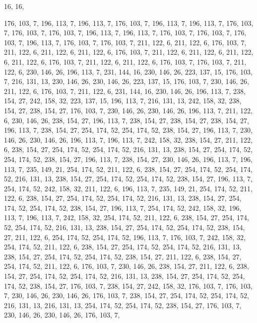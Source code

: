 16, 16,

176, 103, 7, 196, 113, 7, 196, 113, 7, 176, 103, 7, 196, 113, 7, 196,
113, 7, 176, 103, 7, 176, 103, 7, 176, 103, 7, 196, 113, 7, 196, 113,
7, 176, 103, 7, 176, 103, 7, 176, 103, 7, 196, 113, 7, 176, 103, 7,
176, 103, 7, 211, 122, 6, 211, 122, 6, 176, 103, 7, 211, 122, 6, 211,
122, 6, 211, 122, 6, 176, 103, 7, 211, 122, 6, 211, 122, 6, 211, 122,
6, 211, 122, 6, 176, 103, 7, 211, 122, 6, 211, 122, 6, 176, 103, 7,
176, 103, 7, 211, 122, 6, 230, 146, 26, 196, 113, 7, 231, 144, 16, 230,
146, 26, 223, 137, 15, 176, 103, 7, 216, 131, 13, 230, 146, 26, 230, 146,
26, 223, 137, 15, 176, 103, 7, 230, 146, 26, 211, 122, 6, 176, 103, 7,
211, 122, 6, 231, 144, 16, 230, 146, 26, 196, 113, 7, 238, 154, 27, 242,
158, 32, 223, 137, 15, 196, 113, 7, 216, 131, 13, 242, 158, 32, 238, 154,
27, 238, 154, 27, 176, 103, 7, 230, 146, 26, 230, 146, 26, 196, 113, 7,
211, 122, 6, 230, 146, 26, 238, 154, 27, 196, 113, 7, 238, 154, 27, 238,
154, 27, 238, 154, 27, 196, 113, 7, 238, 154, 27, 254, 174, 52, 254, 174,
52, 238, 154, 27, 196, 113, 7, 230, 146, 26, 230, 146, 26, 196, 113, 7,
196, 113, 7, 242, 158, 32, 238, 154, 27, 211, 122, 6, 238, 154, 27, 254,
174, 52, 254, 174, 52, 216, 131, 13, 238, 154, 27, 254, 174, 52, 254, 174,
52, 238, 154, 27, 196, 113, 7, 238, 154, 27, 230, 146, 26, 196, 113, 7,
196, 113, 7, 235, 149, 21, 254, 174, 52, 211, 122, 6, 238, 154, 27, 254,
174, 52, 254, 174, 52, 216, 131, 13, 238, 154, 27, 254, 174, 52, 254, 174,
52, 238, 154, 27, 196, 113, 7, 254, 174, 52, 242, 158, 32, 211, 122, 6,
196, 113, 7, 235, 149, 21, 254, 174, 52, 211, 122, 6, 238, 154, 27, 254,
174, 52, 254, 174, 52, 216, 131, 13, 238, 154, 27, 254, 174, 52, 254, 174,
52, 238, 154, 27, 196, 113, 7, 254, 174, 52, 242, 158, 32, 196, 113, 7,
196, 113, 7, 242, 158, 32, 254, 174, 52, 211, 122, 6, 238, 154, 27, 254,
174, 52, 254, 174, 52, 216, 131, 13, 238, 154, 27, 254, 174, 52, 254, 174,
52, 238, 154, 27, 211, 122, 6, 254, 174, 52, 254, 174, 52, 196, 113, 7,
176, 103, 7, 242, 158, 32, 254, 174, 52, 211, 122, 6, 238, 154, 27, 254,
174, 52, 254, 174, 52, 216, 131, 13, 238, 154, 27, 254, 174, 52, 254, 174,
52, 238, 154, 27, 211, 122, 6, 238, 154, 27, 254, 174, 52, 211, 122, 6,
176, 103, 7, 230, 146, 26, 238, 154, 27, 211, 122, 6, 238, 154, 27, 254,
174, 52, 254, 174, 52, 216, 131, 13, 238, 154, 27, 254, 174, 52, 254, 174,
52, 238, 154, 27, 176, 103, 7, 238, 154, 27, 242, 158, 32, 176, 103, 7,
176, 103, 7, 230, 146, 26, 230, 146, 26, 176, 103, 7, 238, 154, 27, 254,
174, 52, 254, 174, 52, 216, 131, 13, 216, 131, 13, 254, 174, 52, 254, 174,
52, 238, 154, 27, 176, 103, 7, 230, 146, 26, 230, 146, 26, 176, 103, 7,
